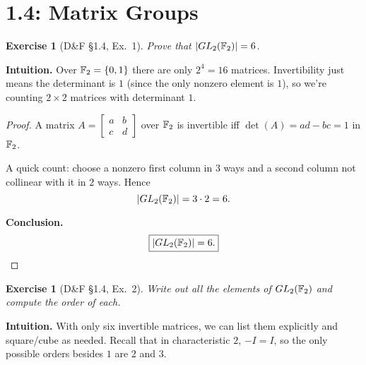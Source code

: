 \documentclass[12pt]{article}
\newtheorem{exercise}[theorem]{Exercise}
\theoremstyle{definition}
\begin{document}
\dotfill
\section*{1.4: Matrix Groups}
\dotfill

\newpage

\begin{exercise}[D\&F §1.4, Ex.~1]
Prove that $\lvert GL_2(\Bbb F_2)\rvert=6$.
\end{exercise}

\dotfill

\noindent\textbf{Intuition.}
Over $\Bbb F_2=\{0,1\}$ there are only $2^4=16$ matrices. Invertibility just means
the determinant is $1$ (since the only nonzero element is $1$), so we’re counting
$2\times2$ matrices with determinant $1$.

\dotfill

\begin{proof}
A matrix $A=\begin{bmatrix}a&b\\ c&d\end{bmatrix}$ over $\Bbb F_2$ is invertible iff
$\det(A)=ad-bc=1$ in $\Bbb F_2$.

A quick count: choose a nonzero first column in $3$ ways and a second column
not collinear with it in $2$ ways. Hence
\[
\lvert GL_2(\Bbb F_2)\rvert=3\cdot2=6.
\]

\smallskip
\noindent\textbf{Conclusion.}
\[
\boxed{\lvert GL_2(\Bbb F_2)\rvert=6.}
\]
\end{proof}

\newpage

\begin{exercise}[D\&F §1.4, Ex.~2]
Write out all the elements of $GL_2(\Bbb F_2)$ and compute the order of each.
\end{exercise}

\dotfill

\noindent\textbf{Intuition.}
With only six invertible matrices, we can list them explicitly and square/cube as needed.
Recall that in characteristic $2$, $-I=I$, so the only possible orders besides $1$
are $2$ and $3$.

\dotfill
\end{document}
